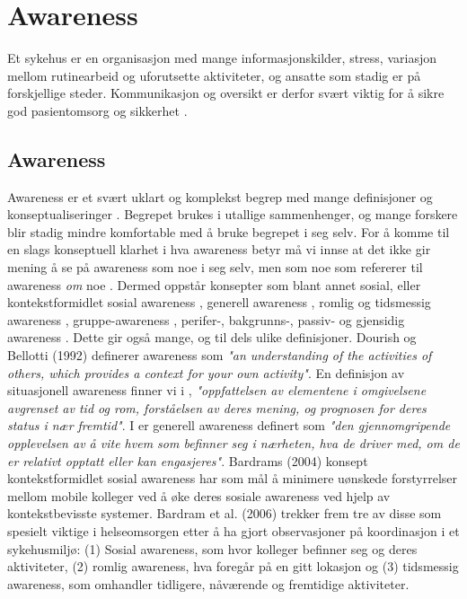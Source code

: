 \section{Awareness}
\label{chp: awareness}

Et sykehus er en organisasjon med mange informasjonskilder, stress, variasjon mellom rutinearbeid og uforutsette aktiviteter, og ansatte som stadig er på forskjellige steder. Kommunikasjon og oversikt er derfor svært viktig for å sikre god pasientomsorg og sikkerhet \cite{Klemets12}.

\subsection{Awareness}
Awareness er et svært uklart og komplekst begrep med mange definisjoner og konseptualiseringer \cite{KlemetsRedundancy, Gutwin04, Schmidt02}. Begrepet brukes i utallige sammenhenger, og mange forskere blir stadig mindre komfortable med å bruke begrepet i seg selv. For å komme til en slags konseptuell klarhet i hva awareness betyr må vi innse at det ikke gir mening å se på awareness som noe i seg selv, men som noe som refererer til awareness \emph{om} noe \cite{Schmidt02}. Dermed oppstår konsepter som blant annet sosial, eller kontekstformidlet sosial awareness \cite{Bardram04}, generell awareness \cite{Gross13}, romlig og tidsmessig awareness \cite{Randell}, gruppe-awareness \cite{Gutwin04}, perifer-, bakgrunns-, passiv- og gjensidig awareness \cite{Schmidt02}. Dette gir også mange, og til dels ulike definisjoner. Dourish og Bellotti (1992)\nocite{Dourish92} definerer awareness som \emph{"an understanding of the activities of others, which provides a context for your own activity"}. En definisjon av situasjonell awareness finner vi i \cite{Endsly95}, \emph{"oppfattelsen av elementene i omgivelsene avgrenset av tid og rom, forståelsen av deres mening, og prognosen for deres status i nær fremtid"}. I \cite{Gross13} er generell awareness definert som \emph{"den gjennomgripende opplevelsen av å vite hvem som befinner seg i nærheten, hva de driver med, om de er relativt opptatt eller kan engasjeres"}. Bardrams (2004) konsept kontekstformidlet sosial awareness har som mål å minimere uønskede forstyrrelser mellom mobile kolleger ved å øke deres sosiale awareness ved hjelp av kontekstbevisste systemer. Bardram et al. (2006) trekker frem tre av disse som spesielt viktige i helseomsorgen etter å ha gjort observasjoner på koordinasjon i et sykehusmiljø: (1) Sosial awareness, som hvor kolleger befinner seg og deres aktiviteter, (2) romlig awareness, hva foregår på en gitt lokasjon og (3) tidsmessig awareness, som omhandler tidligere, nåværende og fremtidige aktiviteter.

